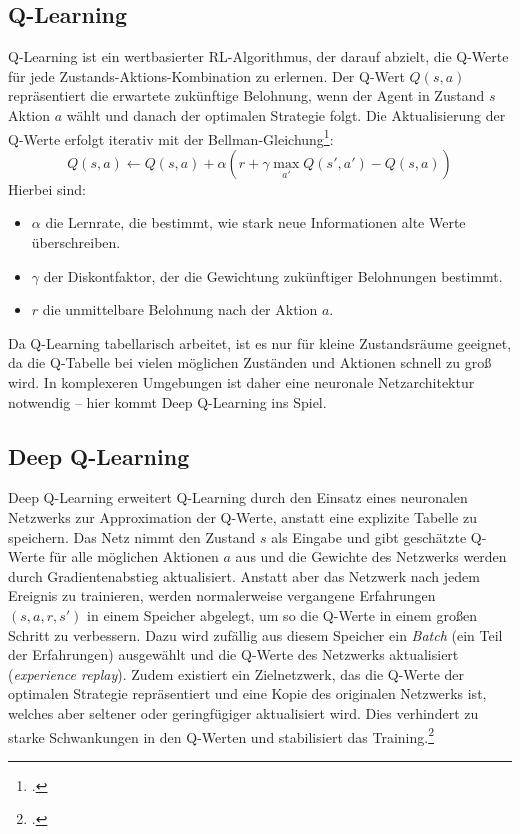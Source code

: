 \subsection{Q-Learning}
Q-Learning ist ein wertbasierter RL-Algorithmus, der darauf abzielt, die Q-Werte 
für jede Zustands-Aktions-Kombination zu erlernen. Der Q-Wert $Q(s,a)$ repräsentiert 
die erwartete zukünftige Belohnung, wenn der Agent in Zustand $s$ Aktion $a$ wählt 
und danach der optimalen Strategie folgt.
Die Aktualisierung der Q-Werte erfolgt iterativ mit der Bellman-Gleichung\footcite{qlearning}:
\begin{equation}
    Q(s,a) \leftarrow Q(s,a) + \alpha (r + \gamma \max_{a'}Q(s',a') - Q(s,a))
\end{equation}
Hierbei sind:
\begin{itemize}
    \item $\alpha$ die Lernrate, die bestimmt, wie stark neue Informationen alte Werte überschreiben.
    \item $\gamma$ der Diskontfaktor, der die Gewichtung zukünftiger Belohnungen bestimmt.
    \item $r$ die unmittelbare Belohnung nach der Aktion $a$.
\end{itemize}
Da Q-Learning tabellarisch arbeitet, ist es nur für kleine Zustandsräume geeignet, 
da die Q-Tabelle bei vielen möglichen Zuständen und Aktionen schnell zu groß wird. 
In komplexeren Umgebungen ist daher eine neuronale Netzarchitektur notwendig -- 
hier kommt Deep Q-Learning ins Spiel.

\subsection{Deep Q-Learning}
Deep Q-Learning erweitert Q-Learning durch den Einsatz eines neuronalen 
Netzwerks zur Approximation der Q-Werte, anstatt eine explizite Tabelle zu 
speichern. Das Netz nimmt den Zustand $s$ als Eingabe und gibt geschätzte Q-Werte 
für alle möglichen Aktionen $a$ aus und die Gewichte des Netzwerks werden durch 
Gradientenabstieg aktualisiert. Anstatt aber das Netzwerk nach jedem Ereignis zu 
trainieren, werden normalerweise vergangene Erfahrungen $(s,a,r,s')$ in einem 
Speicher abgelegt, um so die Q-Werte in einem großen Schritt zu verbessern.
Dazu wird zufällig aus diesem Speicher ein \textit{Batch} (ein Teil der Erfahrungen) 
ausgewählt und die Q-Werte des Netzwerks aktualisiert (\textit{experience replay}).
Zudem existiert ein Zielnetzwerk, das die Q-Werte der optimalen Strategie 
repräsentiert und eine Kopie des originalen Netzwerks ist, welches aber seltener
oder geringfügiger aktualisiert wird. Dies verhindert zu starke Schwankungen in den 
Q-Werten und stabilisiert das Training.\footcite{mnih2013playingatarideepreinforcement}

